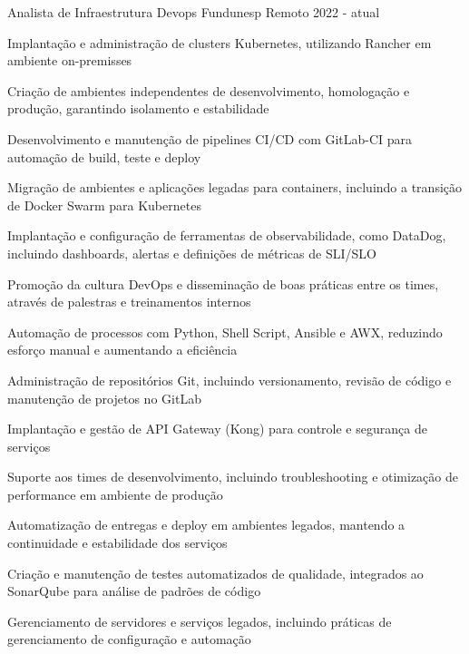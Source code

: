 

\begin{cventries}


\cventry
{Analista de Infraestrutura Devops} %
{Fundunesp} %
{Remoto} %
{2022 - atual} %
{
  \begin{cvitems}
    \item {Implantação e administração de clusters Kubernetes, utilizando Rancher em ambiente on-premisses}
    \item {Criação de ambientes independentes de desenvolvimento, homologação e produção, garantindo isolamento e estabilidade}
    \item {Desenvolvimento e manutenção de pipelines CI/CD com GitLab-CI para automação de build, teste e deploy}
    \item {Migração de ambientes e aplicações legadas para containers, incluindo a transição de Docker Swarm para Kubernetes}
    \item {Implantação e configuração de ferramentas de observabilidade, como DataDog, incluindo dashboards, alertas e definições de métricas de SLI/SLO}
    \item {Promoção da cultura DevOps e disseminação de boas práticas entre os times, através de palestras e treinamentos internos}
    \item {Automação de processos com Python, Shell Script, Ansible e AWX, reduzindo esforço manual e aumentando a eficiência}
    \item {Administração de repositórios Git, incluindo versionamento, revisão de código e manutenção de projetos no GitLab}
    \item {Implantação e gestão de API Gateway (Kong) para controle e segurança de serviços}
    \item {Suporte aos times de desenvolvimento, incluindo troubleshooting e otimização de performance em ambiente de produção}
    \item {Automatização de entregas e deploy em ambientes legados, mantendo a continuidade e estabilidade dos serviços}
    \item {Criação e manutenção de testes automatizados de qualidade, integrados ao SonarQube para análise de padrões de código}
    \item {Gerenciamento de servidores e serviços legados, incluindo práticas de gerenciamento de configuração e automação}
\end{cvitems}
}


\end{cventries}
